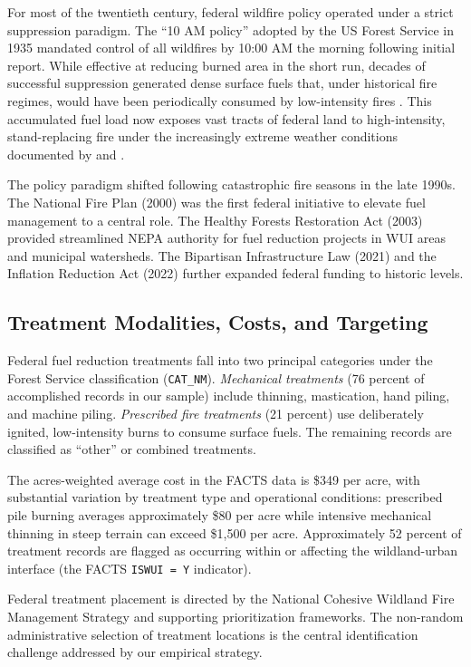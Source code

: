 \documentclass[12pt, letterpaper]{article}
\begin{document}
For most of the twentieth century, federal wildfire policy operated under a strict suppression paradigm. The ``10 AM policy'' adopted by the US Forest Service in 1935 mandated control of all wildfires by 10:00 AM the morning following initial report. While effective at reducing burned area in the short run, decades of successful suppression generated dense surface fuels that, under historical fire regimes, would have been periodically consumed by low-intensity fires \citep{agee2005, stephens2012}. This accumulated fuel load now exposes vast tracts of federal land to high-intensity, stand-replacing fire under the increasingly extreme weather conditions documented by \citet{abatzoglou2016} and \citet{brown2023}.

The policy paradigm shifted following catastrophic fire seasons in the late 1990s. The National Fire Plan (2000) was the first federal initiative to elevate fuel management to a central role. The Healthy Forests Restoration Act (2003) provided streamlined NEPA authority for fuel reduction projects in WUI areas and municipal watersheds. The Bipartisan Infrastructure Law (2021) and the Inflation Reduction Act (2022) further expanded federal funding to historic levels.

\subsection{Treatment Modalities, Costs, and Targeting}

Federal fuel reduction treatments fall into two principal categories under the Forest Service classification (\texttt{CAT\_NM}). \textit{Mechanical treatments} (76 percent of accomplished records in our sample) include thinning, mastication, hand piling, and machine piling. \textit{Prescribed fire treatments} (21 percent) use deliberately ignited, low-intensity burns to consume surface fuels. The remaining records are classified as ``other'' or combined treatments.

The acres-weighted average cost in the FACTS data is \$349 per acre, with substantial variation by treatment type and operational conditions: prescribed pile burning averages approximately \$80 per acre while intensive mechanical thinning in steep terrain can exceed \$1{,}500 per acre. Approximately 52 percent of treatment records are flagged as occurring within or affecting the wildland-urban interface (the FACTS \texttt{ISWUI = Y} indicator).

Federal treatment placement is directed by the National Cohesive Wildland Fire Management Strategy and supporting prioritization frameworks. The non-random administrative selection of treatment locations is the central identification challenge addressed by our empirical strategy.
\end{document}
